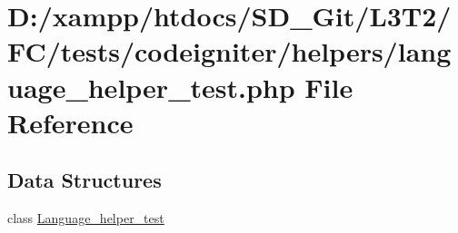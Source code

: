 \hypertarget{language__helper__test_8php}{}\section{D\+:/xampp/htdocs/\+S\+D\+\_\+\+Git/\+L3\+T2/\+F\+C/tests/codeigniter/helpers/language\+\_\+helper\+\_\+test.php File Reference}
\label{language__helper__test_8php}
\subsection*{Data Structures}
\begin{DoxyCompactItemize}
\item 
class \hyperlink{class_language__helper__test}{Language\+\_\+helper\+\_\+test}
\end{DoxyCompactItemize}
